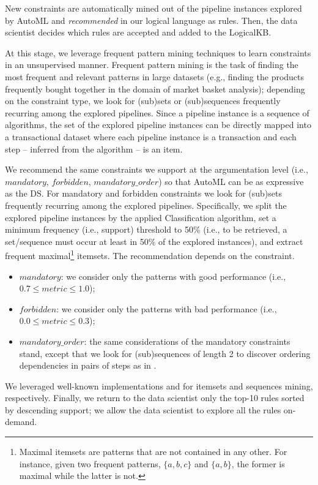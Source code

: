 New constraints are automatically mined out of the pipeline instances explored by AutoML and \emph{recommended} in our logical language as rules.
Then, the data scientist decides which rules are accepted and added to the LogicalKB.


At this stage, we leverage frequent pattern mining techniques to learn constraints in an unsupervised manner.
Frequent pattern mining is the task of finding the most frequent and relevant patterns in large datasets (e.g., finding the products frequently bought together in the domain of market basket analysis); depending on the constraint type, we look for (sub)sets \cite{srikant1995mining} or (sub)sequences \cite{srikant1996mining} frequently recurring among the explored pipelines.
Since a pipeline instance is a sequence of algorithms, the set of the explored pipeline instances can be directly mapped into a transactional dataset \cite{srikant1995mining} where each pipeline instance is a transaction and each step -- inferred from the algorithm -- is an item.

We recommend the same constraints we support at the argumentation level (i.e., $mandatory$, $forbidden$, $mandatory\_order$) so that AutoML can be as expressive as the DS.
For mandatory and forbidden constraints we look for (sub)sets \cite{srikant1995mining} frequently recurring among the explored pipelines.
Specifically, we split the explored pipeline instances by the applied Classification algorithm, set a minimum frequency (i.e., support) threshold to 50\% (i.e., to be retrieved, a set/sequence must occur at least in 50\% of the explored instances), and extract frequent maximal\footnote{Maximal itemsets are patterns that are not contained in any other.
For instance, given two frequent patterns, $\{a, b, c\}$ and $\{a, b\}$, the former is maximal while the latter is not.
}
itemsets.
The recommendation depends on the constraint.
\begin{itemize}
    \item $mandatory$: we consider only the patterns with good performance (i.e.,\\$0.7 \leq metric \leq 1.0$);
    \item $forbidden$: we consider only the patterns with bad performance (i.e.,\\$0.0 \leq metric \leq 0.3$);
    \item $mandatory\_order$: the same considerations of the mandatory constraints stand, except that we look for (sub)sequences \cite{srikant1996mining} of length 2 to discover ordering dependencies in pairs of steps as in .
\end{itemize}
We leveraged well-known implementations \cite{raschkas_2018_mlxtend} and \cite{seq2pat2022} for itemsets and sequences mining, respectively.
Finally, we return to the data scientist only the top-10 rules sorted by descending support; we allow the data scientist to explore all the rules on-demand.


